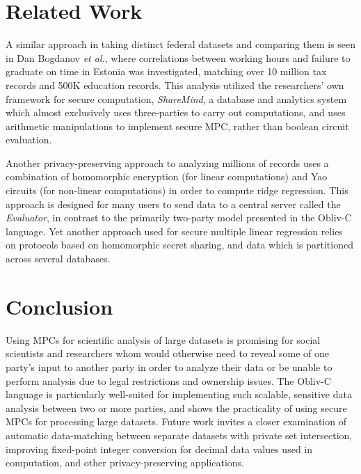 \documentclass[conference]{IEEEtran}
\begin{document}
\section{Related Work}
A similar approach in taking distinct federal datasets and comparing them is seen in
Dan Bogdanov \emph{et al.}, where correlations between working hours and failure to
graduate on time in Estonia was investigated, matching over 10 million 
tax records and 500K education records\cite{cryptoeprint:2015:1159}.
This analysis utilized the researchers' own framework for secure
computation, \emph{ShareMind}, a database and analytics system which 
almost exclusively uses three-parties to carry out computations, and uses arithmetic
manipulations to implement secure MPC, rather than boolean circuit evaluation\cite{sharemind}.

Another privacy-preserving approach to analyzing millions of records uses a
combination of homomorphic encryption (for linear computations) and Yao circuits 
(for non-linear computations) in order to compute ridge regression\cite{ridgeregression}.
This approach is designed for many users to send data to a central server called the 
\emph{Evaluator}, in contrast to the primarily two-party model presented in the Obliv-C
language. Yet another approach used for secure multiple linear regression 
relies on protocols based on homomorphic secret sharing, and data which is partitioned 
across several databases\cite{secretsharing}.
 
\section{Conclusion}
Using MPCs for scientific analysis of large datasets is promising for social scientists
and researchers whom would otherwise need to reveal some of one party's input to another
party in order to analyze their data or be unable to perform analysis due to legal restrictions and ownership issues. 
The Obliv-C language is particularly well-suited for implementing such scalable, 
sensitive data analysis between two or more parties, and shows the practicality of 
using secure MPCs for processing large datasets.
Future work invites a closer examination of automatic data-matching between
separate datasets with private set intersection, improving fixed-point integer 
conversion for decimal data values used in computation, and other privacy-preserving
applications.
\end{document}
